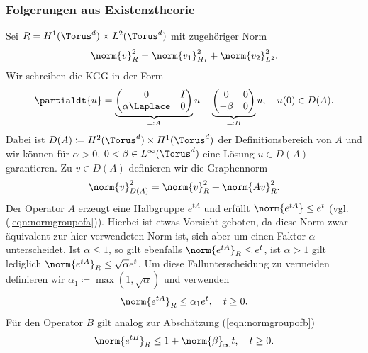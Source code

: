 \subsubsection*{Folgerungen aus Existenztheorie}
Sei $R=H^1(\Torus^d)\times L^2(\Torus^d)$ mit zugehöriger Norm
\[\norm{v}_R^2=\norm{v_1}_{H_1}^2+\norm{v_2}_{L^2}^2.\]
Wir schreiben die KGG in der Form
\[\partialdt{u}=\underbrace{\begin{pmatrix}0 & I\\ \alpha\Laplace & 0\end{pmatrix}}_{\eqqcolon A}u+\underbrace{\begin{pmatrix}0 & 0\\ -\beta & 0\end{pmatrix}}_{\eqqcolon B}u, \quad u(0)\in D(A).\]
Dabei ist $D(A)\coloneqq H^2(\Torus^d)\times H^1(\Torus^d)$ der Definitionsbereich von $A$ und wir können für $\alpha>0$, $0<\beta\in L^\infty(\Torus^d)$ eine Lösung $u\in D(A)$ garantieren. Zu $v\in D(A)$ definieren wir die Graphennorm
\[\norm{v}_{D(A)}^2=\norm{v}_R^2+\norm{Av}_R^2.\]
Der Operator $A$ erzeugt eine Halbgruppe $e^{tA}$ und erfüllt $\norm{e^{tA}}\le e^t$ (vgl. (\ref{eqn:normgroupofa})). Hierbei ist etwas Vorsicht geboten, da diese Norm zwar äquivalent zur hier verwendeten Norm ist, sich aber um einen Faktor $\alpha$ unterscheidet. Ist $\alpha\le 1$, so gilt ebenfalls $\norm{e^{tA}}_R\le e^t$, ist $\alpha>1$ gilt lediglich $\norm{e^{tA}}_R\le \sqrt{\alpha} e^t$. Um diese Fallunterscheidung zu vermeiden definieren wir $\alpha_1\coloneqq \max(1,\sqrt{\alpha})$ und verwenden
\[\norm{e^{tA}}_R\le \alpha_1 e^t, \quad t\ge 0.\]
Für den Operator $B$ gilt analog zur Abschätzung (\ref{eqn:normgroupofb}) 
\[\norm{e^{tB}}_R\le 1+\norm{\beta}_\infty t, \quad t\ge 0.\]
